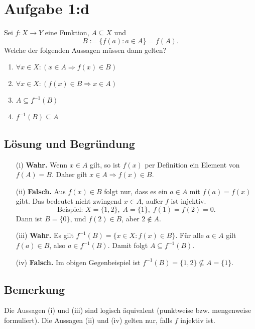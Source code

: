 \documentclass{article}
\begin{document}
\section*{Aufgabe 1:d}
Sei \( f : X \to Y \) eine Funktion, \( A \subseteq X \) und
\[
    B := \{ f(a) : a \in A \} = f(A).
\]
Welche der folgenden Aussagen müssen dann gelten?

\begin{enumerate}[label=(\roman*)]
    \item \( \forall x \in X : (x \in A \Rightarrow f(x) \in B) \)
    \item \( \forall x \in X : (f(x) \in B \Rightarrow x \in A) \)
    \item \( A \subseteq f^{-1}(B) \)
    \item \( f^{-1}(B) \subseteq A \)
\end{enumerate}

\subsection*{Lösung und Begründung}

\begin{itemize}
    \item[(i)] \textbf{Wahr.}
        Wenn \( x \in A \) gilt, so ist \( f(x) \) per Definition ein Element von \( f(A) = B \).
        Daher gilt \( x \in A \Rightarrow f(x) \in B \).

    \item[(ii)] \textbf{Falsch.}
        Aus \( f(x) \in B \) folgt nur, dass es ein \( a \in A \) mit \( f(a) = f(x) \) gibt.
        Das bedeutet nicht zwingend \( x \in A \), außer \( f \) ist injektiv.
        \[
            \text{Beispiel: } X = \{1,2\},\; A = \{1\},\; f(1) = f(2) = 0.
        \]
        Dann ist \( B = \{0\} \), und \( f(2) \in B \), aber \( 2 \notin A \).

    \item[(iii)] \textbf{Wahr.}
        Es gilt \( f^{-1}(B) = \{ x \in X : f(x) \in B \} \).
        Für alle \( a \in A \) gilt \( f(a) \in B \), also \( a \in f^{-1}(B) \).
        Damit folgt \( A \subseteq f^{-1}(B) \).

    \item[(iv)] \textbf{Falsch.}
        Im obigen Gegenbeispiel ist \( f^{-1}(B) = \{1,2\} \not\subseteq A = \{1\} \).
\end{itemize}

\subsection*{Bemerkung}
Die Aussagen (i) und (iii) sind logisch äquivalent (punktweise bzw. mengenweise formuliert).
Die Aussagen (ii) und (iv) gelten nur, falls \( f \) injektiv ist.
\end{document}
